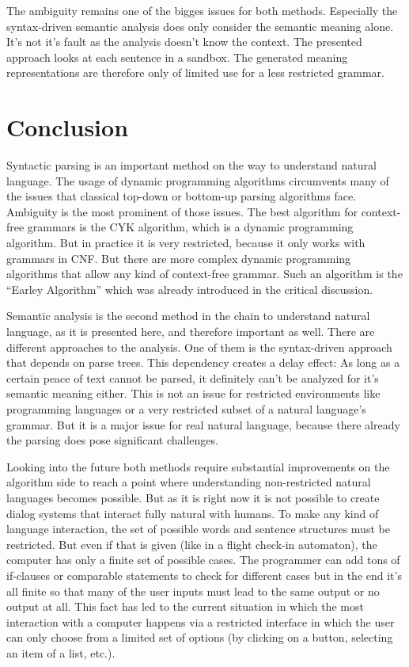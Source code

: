 \documentclass[12pt,twoside]{scrartcl}
\theoremstyle{plain}
\theoremstyle{definition}
\theoremstyle{remark}
\begin{document}
	The ambiguity remains one of the bigges issues for both methods. Especially the syntax-driven semantic analysis does only consider the semantic meaning alone. It's not it's fault as the analysis doesn't know the context. The presented approach looks at each sentence in a sandbox. The generated meaning representations are therefore only of limited use for a less restricted grammar.
	
\section{Conclusion}
\label{sec:concl}

	Syntactic parsing is an important method on the way to understand natural language. The usage of dynamic programming algorithms circumvents many of the issues that classical top-down or bottom-up parsing algorithms face. Ambiguity is the most prominent of those issues. The best algorithm for context-free grammars is the CYK algorithm, which is a dynamic programming algorithm. But in practice it is very restricted, because it only works with grammars in CNF. But there are more complex dynamic programming algorithms that allow any kind of context-free grammar. Such an algorithm is the ``Earley Algorithm''\cite[p.~477]{Jurafsky2009b} which was already introduced in the critical discussion.
	
	Semantic analysis is the second method in the chain to understand natural language, as it is presented here, and therefore important as well. There are different approaches to the analysis. One of them is the syntax-driven approach that depends on parse trees. This dependency creates a delay effect: As long as a certain peace of text cannot be parsed, it definitely can't be analyzed for it's semantic meaning either. This is not an issue for restricted environments like programming languages or a very restricted subset of a natural language's grammar. But it is a major issue for real natural language, because there already the parsing does pose significant challenges.
	
	Looking into the future both methods require substantial improvements on the algorithm side to reach a point where understanding non-restricted natural languages becomes possible. But as it is right now it is not possible to create dialog systems that interact fully natural with humans. To make any kind of language interaction, the set of possible words and sentence structures must be restricted. But even if that is given (like in a flight check-in automaton), the computer has only a finite set of possible cases. The programmer can add tons of if-clauses or comparable statements to check for different cases but in the end it's all finite so that many of the user inputs must lead to the same output or no output at all. This fact has led to the current situation in which the most interaction with a computer happens via a restricted interface in which the user can only choose from a limited set of options (by clicking on a button, selecting an item of a list, etc.).
	
\end{document}
